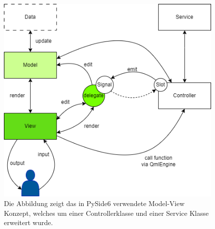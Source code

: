 \label{exampleListview}
\newpage

\begin{figure}
        \caption[Model-View Konzept mit zusätzlichem Controller und Service ]
        {\small Die Abbildung zeigt das in PySide6 verwendete Model-View Konzept, welches um einer Controllerklasse und
        einer Service Klasse erweitert wurde. }\label{fig:figure10}
        \includegraphics[width = \textwidth ]{Bilder/MVCS_Beispiel}
        \centering
\end{figure}

\newpage


